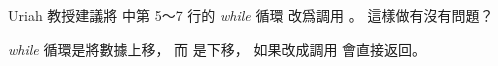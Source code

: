\startEXERCISE
Uriah 教授建議將  中第 5～7 行的 \emph{while} 循環
改爲調用 。
這樣做有沒有問題？
\stopEXERCISE

\startANSWER
\emph{while} 循環是將數據上移，
而  是下移，
如果改成調用  會直接返回。
\stopANSWER
